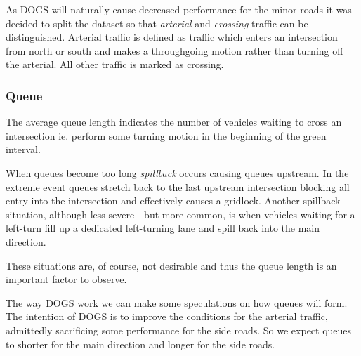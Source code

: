 As DOGS will naturally cause decreased performance for the minor roads it was decided to split the dataset so that \textit{arterial} and \textit{crossing} traffic can be distinguished. Arterial traffic is defined as traffic which enters an intersection from north or south and makes a throughgoing motion rather than turning off the arterial. All other traffic is marked as crossing.

\subsubsection*{Queue}
The average queue length indicates the number of vehicles waiting to cross an intersection ie. perform some turning motion in the beginning of the green interval. 

When queues become too long \textit{spillback} occurs causing queues upstream. In the extreme event queues stretch back to the last upstream intersection blocking all entry into the intersection and effectively causes a gridlock.
Another spillback situation, although less severe - but more common, is when vehicles waiting for a left-turn fill up a dedicated left-turning lane and spill back into the main direction.

These situations are, of course, not desirable and thus the queue length is an important factor to observe.

The way DOGS work we can make some speculations on how queues will form. The intention of DOGS is to improve the conditions for the arterial traffic, admittedly sacrificing some performance for the side roads. So we expect queues to shorter for the main direction and longer for the side roads.

